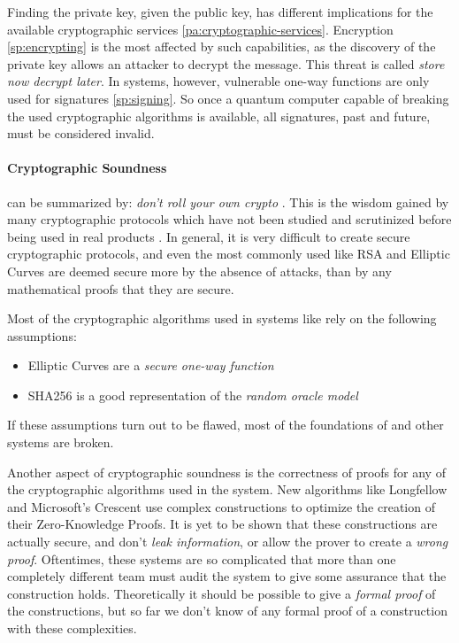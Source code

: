 Finding the private key, given the public key, has different implications for
the available cryptographic services \ref{pa:cryptographic-services}.
Encryption \ref{sp:encrypting} is the most affected by such capabilities, as the discovery
of the private key allows an attacker to decrypt the message.
This threat is called \emph{store now decrypt later}.
In \eid systems, however, vulnerable one-way functions are only used for
signatures \ref{sp:signing}.
So once a quantum computer capable of breaking the used cryptographic algorithms is
available, all signatures, past and future, must be considered invalid.

\paragraph{Cryptographic Soundness} can be summarized by:
\emph{don't roll your own crypto} \cite{SchneierLaw11}.
This is the wisdom gained by many cryptographic protocols which have not been
studied and scrutinized before being used in real products \cite{Vaudenay02}.
In general, it is very difficult to create secure cryptographic protocols, and even
the most commonly used like RSA and Elliptic Curves are deemed secure more by the
absence of attacks, than by any mathematical proofs that they are secure.

Most of the cryptographic algorithms used in \eid systems like \swiyu rely on the
following assumptions:
\begin{itemize}
    \item Elliptic Curves are a \emph{secure one-way function}
    \item SHA256 is a good representation of the \emph{random oracle model}
\end{itemize}
If these assumptions turn out to be flawed, most of the foundations of \eid and other systems
are broken.

Another aspect of cryptographic soundness is the correctness of proofs for any of the cryptographic
algorithms used in the system.
New algorithms like Longfellow \cite{FS24} and Microsoft's Crescent \cite{FFL25} use complex constructions to optimize the creation of their
Zero-Knowledge Proofs.
It is yet to be shown that these constructions are actually secure, and don't 
\emph{leak information}, or allow the prover to create a \emph{wrong proof}.
Oftentimes, these systems are so complicated that more than one completely different team must audit the system to give some assurance that the construction holds.
Theoretically it should be possible to give a \emph{formal proof} of the constructions,
but so far we don't know of any formal proof of a construction with these
complexities.

